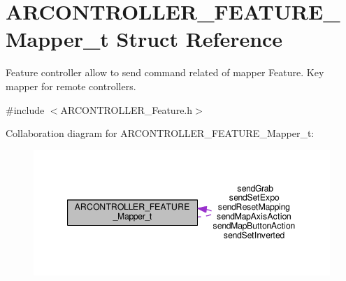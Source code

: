 \hypertarget{struct_a_r_c_o_n_t_r_o_l_l_e_r___f_e_a_t_u_r_e___mapper__t}{}\section{A\+R\+C\+O\+N\+T\+R\+O\+L\+L\+E\+R\+\_\+\+F\+E\+A\+T\+U\+R\+E\+\_\+\+Mapper\+\_\+t Struct Reference}
\label{struct_a_r_c_o_n_t_r_o_l_l_e_r___f_e_a_t_u_r_e___mapper__t}


Feature controller allow to send command related of mapper Feature. Key mapper for remote controllers.  




{\ttfamily \#include $<$A\+R\+C\+O\+N\+T\+R\+O\+L\+L\+E\+R\+\_\+\+Feature.\+h$>$}



Collaboration diagram for A\+R\+C\+O\+N\+T\+R\+O\+L\+L\+E\+R\+\_\+\+F\+E\+A\+T\+U\+R\+E\+\_\+\+Mapper\+\_\+t\+:
\nopagebreak
\begin{figure}[H]
\begin{center}
\leavevmode
\includegraphics[width=347pt]{struct_a_r_c_o_n_t_r_o_l_l_e_r___f_e_a_t_u_r_e___mapper__t__coll__graph}
\end{center}
\end{figure}
